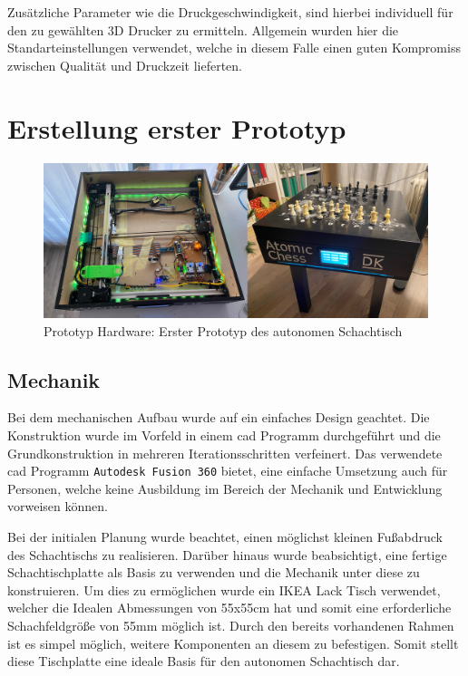 Zusätzliche Parameter wie die Druckgeschwindigkeit, sind hierbei
individuell für den zu gewählten 3D Drucker zu ermitteln. Allgemein
wurden hier die Standarteinstellungen verwendet, welche in diesem Falle
einen guten Kompromiss zwischen Qualität und Druckzeit lieferten.

\hypertarget{erstellung-erster-prototyp}{%
\chapter{Erstellung erster Prototyp}\label{erstellung-erster-prototyp}}

\begin{figure}
\centering
\includegraphics{images/table_images/dk.png}
\caption{Prototyp Hardware: Erster Prototyp des autonomen Schachtisch
\label{dk}}
\end{figure}

\hypertarget{mechanik}{%
\section{Mechanik}\label{mechanik}}

Bei dem mechanischen Aufbau wurde auf ein einfaches Design geachtet. Die
Konstruktion wurde im Vorfeld in einem \gls{cad} Programm durchgeführt
und die Grundkonstruktion in mehreren Iterationsschritten verfeinert.
Das verwendete \gls{cad} Programm
\passthrough{\lstinline!Autodesk Fusion 360!} bietet, eine einfache
Umsetzung auch für Personen, welche keine Ausbildung im Bereich der
Mechanik und Entwicklung vorweisen können.

Bei der initialen Planung wurde beachtet, einen möglichst kleinen
Fußabdruck des Schachtischs zu realisieren. Darüber hinaus wurde
beabsichtigt, eine fertige Schachtischplatte als Basis zu verwenden und
die Mechanik unter diese zu konstruieren. Um dies zu ermöglichen wurde
ein IKEA Lack Tisch verwendet, welcher die Idealen Abmessungen von
55x55cm hat und somit eine erforderliche Schachfeldgröße von 55mm
möglich ist. Durch den bereits vorhandenen Rahmen ist es simpel möglich,
weitere Komponenten an diesem zu befestigen. Somit stellt diese
Tischplatte eine ideale Basis für den autonomen Schachtisch dar.

